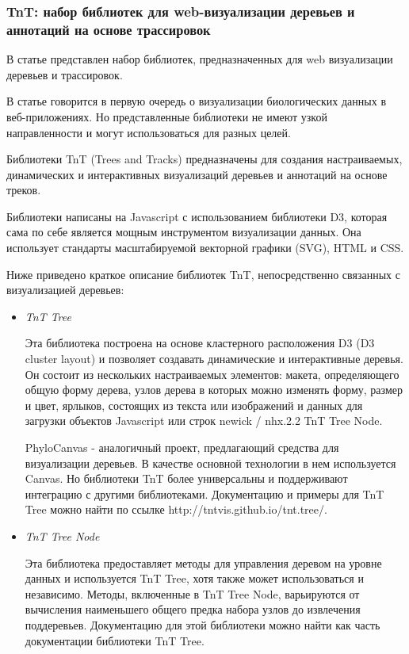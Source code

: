\subsubsection{TnT: набор библиотек для web-визуализации деревьев и аннотаций на основе трассировок \cite{Pignatelli2016}}

В статье представлен набор библиотек, предназначенных для web визуализации деревьев и трассировок.

В статье говорится в первую очередь о визуализации биологических данных в веб-приложениях. Но представленные библиотеки не имеют узкой направленности и могут использоваться для разных целей.

Библиотеки TnT (Trees and Tracks) предназначены для создания настраиваемых, динамических и интерактивных визуализаций деревьев и аннотаций на основе треков. 

Библиотеки написаны на Javascript с использованием библиотеки D3, которая сама по себе является мощным инструментом визуализации данных. Она использует стандарты масштабируемой векторной графики (SVG), HTML и CSS.

Ниже приведено краткое описание библиотек TnT, непосредственно связанных с визуализацией деревьев:

\begin{itemize}
	\item \textit{TnT Tree}
	
	Эта библиотека построена на основе кластерного расположения D3 (D3 cluster layout) и позволяет создавать динамические и интерактивные деревья. Он состоит из нескольких настраиваемых элементов: макета, определяющего общую форму дерева, узлов дерева в которых можно изменять форму, размер и цвет, ярлыков, состоящих из текста или изображений и данных для загрузки объектов Javascript или строк newick / nhx.2.2 TnT Tree Node.
	
	PhyloCanvas - аналогичный проект, предлагающий средства для визуализации деревьев. В качестве основной технологии в нем используется Canvas. Но библиотеки TnT более универсальны и поддерживают интеграцию с другими библиотеками. Документацию и примеры для TnT Tree можно найти по ссылке http://tntvis.github.io/tnt.tree/.
	
	\item \textit{TnT Tree Node}	
	
	Эта библиотека предоставляет методы для управления деревом на уровне данных и используется TnT Tree, хотя также может использоваться и независимо. Методы, включенные в TnT Tree Node, варьируются от вычисления наименьшего общего предка набора узлов до извлечения поддеревьев. Документацию для этой библиотеки можно найти как часть документации библиотеки TnT Tree.
\end{itemize}

